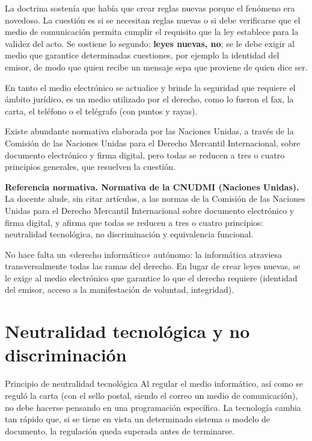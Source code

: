 \documentclass[12pt,oneside]{book}
\begin{document}
La doctrina sostenía que había que crear reglas nuevas porque el fenómeno era novedoso. La cuestión es si se necesitan reglas nuevas o si debe verificarse que el medio de comunicación permita cumplir el requisito que la ley establece para la validez del acto. Se sostiene lo segundo: \textbf{leyes nuevas, no}; se le debe exigir al medio que garantice determinadas cuestiones, por ejemplo la identidad del emisor, de modo que quien recibe un mensaje sepa que proviene de quien dice ser.

En tanto el medio electrónico se actualice y brinde la seguridad que requiere el ámbito jurídico, es un medio utilizado por el derecho, como lo fueron el fax, la carta, el teléfono o el telégrafo (con puntos y rayas).

Existe abundante normativa elaborada por las Naciones Unidas, a través de la Comisión de las Naciones Unidas para el Derecho Mercantil Internacional, sobre documento electrónico y firma digital, pero todas se reducen a tres o cuatro principios generales, que resuelven la cuestión.

\begin{note}
\textbf{Referencia normativa. Normativa de la CNUDMI (Naciones Unidas).} La docente alude, sin citar artículos, a las normas de la Comisión de las Naciones Unidas para el Derecho Mercantil Internacional sobre documento electrónico y firma digital, y afirma que todas se reducen a tres o cuatro principios: neutralidad tecnológica, no discriminación y equivalencia funcional.
\end{note}

\begin{important}
No hace falta un «derecho informático» autónomo: la informática atraviesa transversalmente todas las ramas del derecho. En lugar de crear leyes nuevas, se le exige al medio electrónico que garantice lo que el derecho requiere (identidad del emisor, acceso a la manifestación de voluntad, integridad).
\end{important}

\section{Neutralidad tecnológica y no discriminación}

\begin{definition}{Principio de neutralidad tecnológica}
Al regular el medio informático, así como se reguló la carta (con el sello postal, siendo el correo un medio de comunicación), no debe hacerse pensando en una programación específica. La tecnología cambia tan rápido que, si se tiene en vista un determinado sistema o modelo de documento, la regulación queda superada antes de terminarse.
\end{definition}
\end{document}
